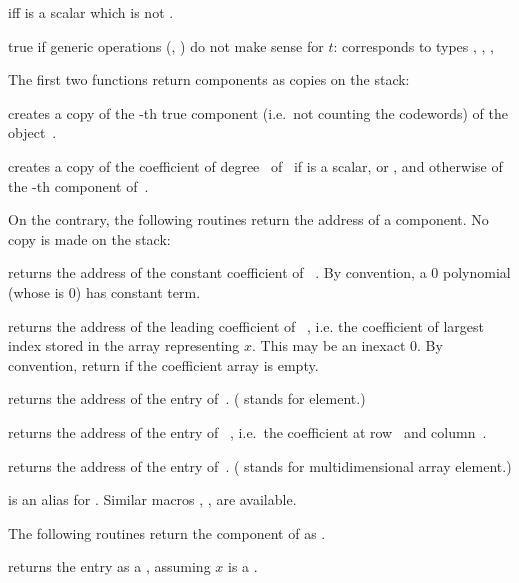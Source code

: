   iff  is a scalar which is not
.

 true if generic operations (,
) do not make sense for $t$: corresponds to types
, , , 

\label{se:accessors}
The first two functions return  components as copies on the stack:

 creates a copy of the -th true
component (i.e.\ not counting the codewords) of the object~.

 creates a copy of the coefficient of
degree~ of~ if  is a scalar,  or ,
and otherwise of the -th component of~.
\smallskip

\noindent On the contrary, the following routines return the address of a
 component. No copy is made on the stack:

 returns the address of the constant
coefficient of ~. By convention, a $0$ polynomial (whose
 is $0$) has  constant term.

 returns the address of the leading coefficient
of ~, i.e. the coefficient of largest index stored in the
array representing $x$. This may be an inexact $0$. By convention, return
 if the coefficient array is empty.

 returns the address of the
 entry of~. ( stands for element.)

 returns the address of the
 entry of ~, i.e.~the coefficient at row~
and column~.

 returns the address of the
 entry of~. ( stands for multidimensional array
element.)

 is an alias for .
Similar macros , ,  are available.

\noindent The following routines return the component of  as
.

 returns the entry  as a ,
assuming $x$ is a .


